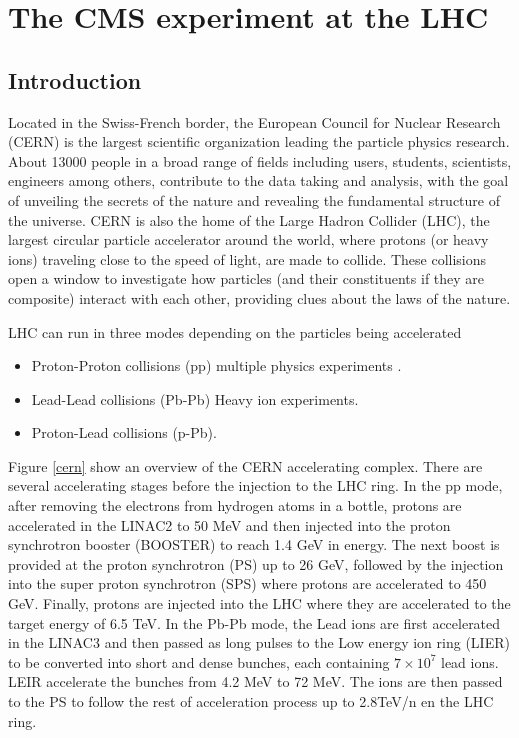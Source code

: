 \chapter{The CMS experiment at the LHC}\label{ch:cms}

\section{Introduction}\label{sec:cms_intro}
\noindent Located in the Swiss-French border, the European Council for Nuclear Research (CERN) is the largest scientific organization leading the particle physics research. About 13000 people in a broad range of fields including users, students, scientists, engineers among others, contribute to the data taking and analysis, with the goal of unveiling the secrets of the nature and revealing the fundamental structure of the universe. CERN is also the home of the Large Hadron Collider (LHC), the largest circular particle accelerator around the world, where protons (or heavy ions) traveling close to the speed of light, are made to collide. These collisions open a window to investigate how particles (and their constituents if they are composite) interact with each other, providing clues about the laws of the nature.

\noindent LHC can run in three modes depending on the particles being accelerated

\begin{itemize}
\item Proton-Proton collisions (pp) multiple physics experiments .
\item Lead-Lead collisions (Pb-Pb) Heavy ion experiments. 
\item Proton-Lead collisions (p-Pb).
\end{itemize}

\noindent Figure \ref{cern} show an overview of the CERN accelerating complex. There are several accelerating stages before the injection to the LHC ring. In the pp mode, after removing the electrons from hydrogen atoms in a bottle, protons are accelerated in the LINAC2 to 50 MeV and then injected into the proton synchrotron booster (BOOSTER) to reach 1.4 GeV in energy. The next boost is provided at the proton synchrotron (PS) up to 26 GeV, followed by the injection into the super proton synchrotron (SPS) where protons are accelerated to 450 GeV. Finally, protons are injected into the LHC where they are accelerated to the target energy of 6.5 TeV. In the Pb-Pb mode, the Lead ions are first accelerated in the LINAC3 and then passed as long pulses to the Low energy ion ring (LIER) to be converted into short and dense bunches, each containing $7\times10^7$ lead ions. LEIR accelerate the bunches from 4.2 MeV to 72 MeV. The ions are then passed to the PS to follow the rest of acceleration process up to 2.8TeV/n en the LHC ring. 

